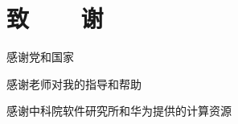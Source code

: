 \renewcommand{\baselinestretch}{1.5}
\fontsize{12pt}{13pt}\selectfont
{}
\chapter*{致~~~~谢}

感谢党和国家

感谢老师对我的指导和帮助

感谢中科院软件研究所和华为提供的计算资源

\clearpage
\endinput